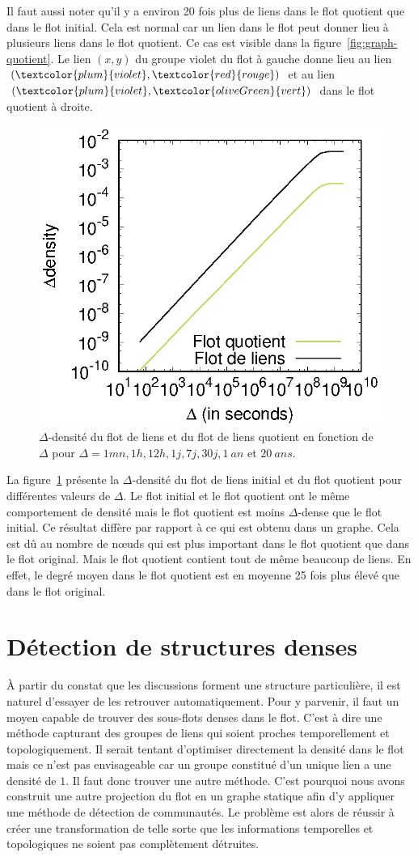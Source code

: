 Il faut aussi noter qu'il y a environ 20 fois plus de liens dans le flot quotient que dans le flot initial.
Cela est normal car un lien dans le flot peut donner lieu à plusieurs liens dans le flot quotient.
Ce cas est visible dans la figure~\ref{fig:graph-quotient}. 
Le lien $(x,y)$ du groupe violet du flot à gauche donne lieu au lien $(\textcolor{plum}{violet}, \textcolor{red}{rouge})$ et au lien $(\textcolor{plum}{violet}, \textcolor{oliveGreen}{vert})$ dans le flot quotient à droite. 

\begin{figure}
\centering
	\includegraphics[width=0.4\linewidth]{img/mailing/quotient-density}
	\caption{$\Delta$-densité du flot de liens et du flot de liens quotient en fonction de $\Delta$ pour $\Delta=1mn, 1h, 12h, 1j, 7j, 30j, 1\ an$ et $20\ ans$.}
	\label{fig:quotient-stream-density}
\end{figure}

La figure~\ref{fig:quotient-stream-density} présente la $\Delta$-densité du flot de liens initial et du flot quotient pour différentes valeurs de $\Delta$.
Le flot initial et le flot quotient ont le même comportement de densité mais le flot quotient est moins $\Delta$-dense que le flot initial.
Ce résultat diffère par rapport à ce qui est obtenu dans un graphe.
Cela est dû au nombre de n\oe{}uds qui est plus important dans le flot quotient que dans le flot original.
Mais le flot quotient contient tout de même beaucoup de liens. 
En effet, le degré moyen dans le flot quotient est en moyenne 25 fois plus élevé que dans le flot original.


\section{Détection de structures denses}

\`A partir du constat que les discussions forment une structure particulière, il est naturel d'essayer de les retrouver automatiquement. 
Pour y parvenir, il faut un moyen capable de trouver des sous-flots denses dans le flot.
C'est à dire une méthode capturant des groupes de liens qui soient proches temporellement et topologiquement.
Il serait tentant d'optimiser directement la densité dans le flot mais ce n'est pas envisageable car un groupe constitué d'un unique lien a une densité de $1$.
Il faut donc trouver une autre méthode.
C'est pourquoi nous avons construit une autre projection du flot en un graphe statique afin d'y appliquer une méthode de détection de communautés.
Le problème est alors de réussir à créer une transformation de telle sorte que les informations temporelles et topologiques ne soient pas complètement détruites.


